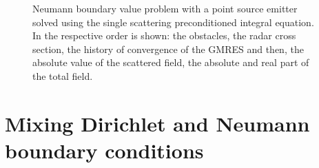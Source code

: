 \begin{figure}
\caption{Neumann boundary value problem with a point source emitter solved using the single scattering preconditioned integral equation. In the respective order is shown: the obstacles, the radar cross section, the history of convergence of the GMRES and then, the absolute value of the scattered field, the absolute and real part of the total field.}
\label{fig:exampleNeumannPS}
\end{figure}


\newpage
\section{Mixing Dirichlet and Neumann boundary conditions}

